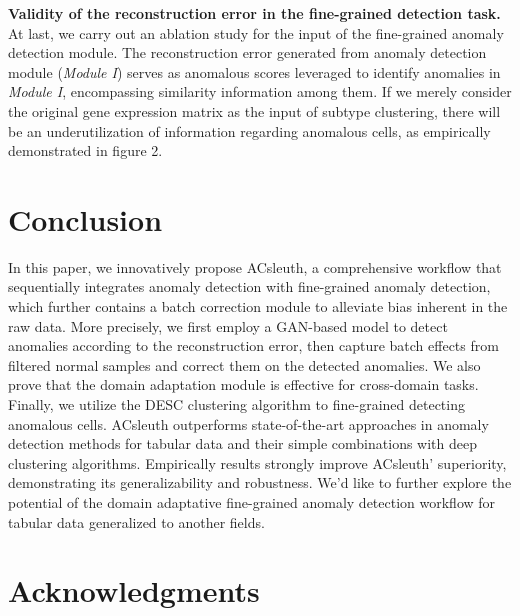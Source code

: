 \documentclass{article}
\begin{document}
\textbf{Validity of the reconstruction error in the fine-grained detection task.}	At last, we carry out an 
ablation study for the input of the fine-grained anomaly detection module. The 
reconstruction error generated from anomaly detection module (\textit{Module I}) serves as 
anomalous scores leveraged to identify anomalies in \textit{Module I}, encompassing similarity 
information among them. If we merely consider the original gene expression matrix as the 
input of subtype clustering, there will be an underutilization of information regarding 
anomalous cells, as empirically demonstrated in figure 2.
\section{Conclusion}
In this paper, we innovatively propose ACsleuth, a comprehensive workflow that sequentially 
integrates anomaly detection with fine-grained anomaly detection, which further contains a batch 
correction module to alleviate bias inherent in the raw data. More precisely, we first 
employ a GAN-based model to detect anomalies according to the reconstruction error, then 
capture batch effects from filtered normal samples and correct them on the detected 
anomalies. We also prove that the domain adaptation module is effective for cross-domain tasks. 
Finally, we utilize the DESC clustering algorithm to fine-grained detecting anomalous cells. 
ACsleuth outperforms state-of-the-art approaches in anomaly detection methods for tabular 
data and their simple combinations with deep clustering algorithms. Empirically results 
strongly improve ACsleuth’ superiority, demonstrating its generalizability and robustness. 
We’d like to further explore the potential of the domain adaptative fine-grained anomaly 
detection workflow for tabular data generalized to another fields.
\section*{Acknowledgments}






\end{document}
